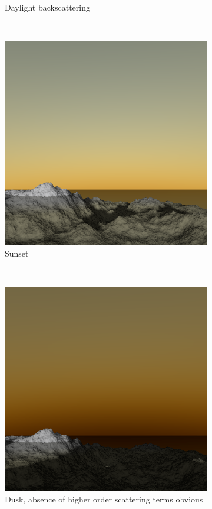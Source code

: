 \documentclass{article}
\begin{document}
\begin{figure}[H]
\begin{subfigure}[b]{0.45\textwidth}
        \caption{Daylight backscattering}
        \label{fig:light7}
    \end{subfigure}
    ~
    \begin{subfigure}[b]{0.45\textwidth}
        \centering
        \includegraphics[scale=0.25]{light19}
        \caption{Sunset}
        \label{fig:light10}
    \end{subfigure}
    ~
    \begin{subfigure}[b]{0.45\textwidth}
        \centering
        \includegraphics[scale=0.25]{light21}
        \caption{Dusk, absence of higher order scattering terms obvious}
        \label{fig:light10}
    \end{subfigure}
    \caption{}
    \label{fig:sunriseset}
\end{figure}
\end{document}
